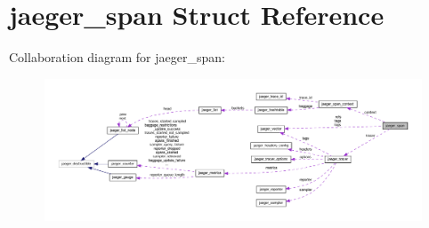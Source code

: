 \hypertarget{structjaeger__span}{}\section{jaeger\+\_\+span Struct Reference}
\label{structjaeger__span}


Collaboration diagram for jaeger\+\_\+span\+:\nopagebreak
\begin{figure}[H]
\begin{center}
\leavevmode
\includegraphics[width=350pt]{structjaeger__span__coll__graph}
\end{center}
\end{figure}
